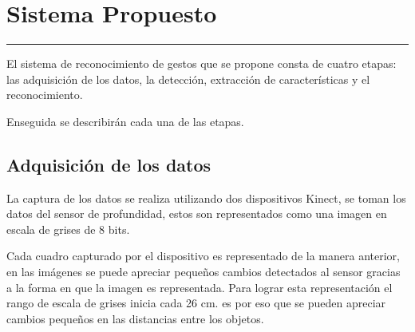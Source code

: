 \chapter{Sistema Propuesto}\label{capit:cap3}
\vspace{-2.0325ex}%
\noindent
\rule{\textwidth}{0.5pt}
\vspace{-5.5ex}%
\newcommand{\pushline}{\Indp}%

El sistema de reconocimiento de gestos que se propone consta de cuatro etapas: las adquisición de los datos, la detección, extracción de características y el reconocimiento. 

Enseguida se describirán cada una de las etapas. 

\section{Adquisición de los datos}

La captura de los datos se realiza utilizando dos dispositivos Kinect, se toman los datos del sensor de profundidad, estos son representados como una imagen en escala de grises de 8 bits.  

Cada cuadro capturado por el dispositivo es representado de la manera anterior, en las imágenes se puede apreciar pequeños cambios detectados al sensor gracias a la forma en que la imagen es representada. Para lograr esta representación el rango de escala de grises inicia cada 26 cm. es por eso que se pueden apreciar cambios pequeños en las distancias entre los objetos. 

